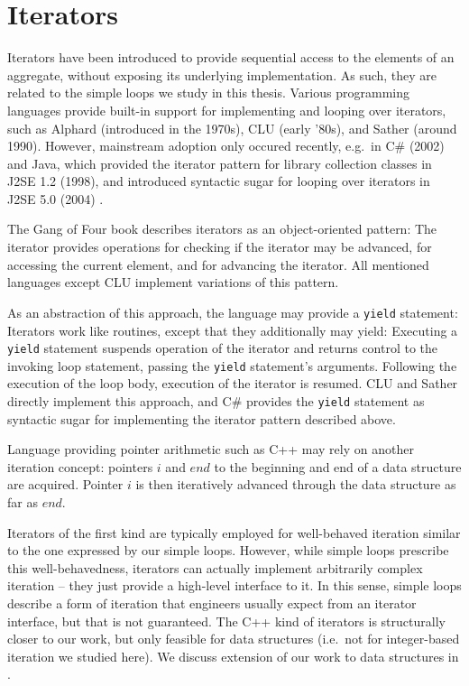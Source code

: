 \section{Iterators}

Iterators have been introduced to provide sequential access to the elements of an aggregate, without exposing its underlying implementation. As such, they are related to the simple loops we study in this thesis.
Various programming languages provide built-in support for implementing and looping over iterators, such as Alphard \cite{DBLP:journals/cacm/ShawWL77} (introduced in the 1970s), CLU \cite{DBLP:books/sp/Liskov81} (early '80s), and Sather \cite{DBLP:journals/toplas/MurerOSS96} (around 1990). However, mainstream adoption only occured recently, e.g.\ in C\# (2002) and Java, which provided the iterator pattern for library collection classes in J2SE 1.2 (1998), and introduced syntactic sugar for looping over iterators in J2SE 5.0 (2004) \cite{Sun:2004:Online}.

The Gang of Four book \cite{Gamma:1995} describes iterators as an object-oriented pattern: The iterator provides operations for checking if the iterator may be advanced, for accessing the current element, and for advancing the iterator. All mentioned languages except CLU implement variations of this pattern.

As an abstraction of this approach, the language may provide a \verb|yield| statement: Iterators work like routines, except that they additionally may yield: Executing a \verb|yield| statement suspends operation of the iterator and returns control to the invoking loop statement, passing the \verb|yield| statement's arguments. Following the execution of the loop body, execution of the iterator is resumed. CLU and Sather directly implement this approach, and C\# provides the \verb|yield| statement as syntactic sugar for implementing the iterator pattern described above.

Language providing pointer arithmetic such as C++ may rely on another iteration concept: pointers $i$ and $end$ to the beginning and end of a data structure are acquired. Pointer $i$ is then iteratively advanced through the data structure as far as $end$.

Iterators of the first kind are typically employed for well-behaved iteration similar to the one expressed by our simple loops. However, while simple loops prescribe this well-behavedness, iterators can actually implement arbitrarily complex iteration -- they just provide a high-level interface to it. In this sense, simple loops describe a form of iteration that engineers usually expect from an iterator interface, but that is not guaranteed. The C++ kind of iterators is structurally closer to our work, but only feasible for data structures (i.e.\ not for integer-based iteration we studied here). We discuss extension of our work to data structures in .

